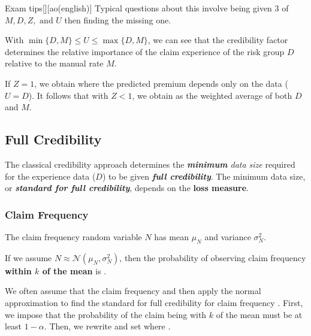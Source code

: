 \documentclass[english]{article}
\begin{document}
\begin{multicols*}{2}
\begin{definitionGENERAL}{Exam tips}[][ao(english)]
Typical questions about this involve being given 3 of $M, D, Z, \text{ and } U$ then finding the missing one.
\end{definitionGENERAL}


\begin{rappel_enhanced}[Context]
With $\min\{D, M\} \leq U \leq \max\{D, M\}$, we can see that the credibility factor determines the relative importance of the claim experience of the risk group $D$ relative to the manual rate $M$.

\bigskip

If $Z = 1$, we obtain \textit{\underline{}} where the predicted premium depends only on the data ($U = D$). It follows that with $Z < 1$, we obtain \textit{\underline{}} as the weighted average of both $D$ and $M$.
\end{rappel_enhanced}


\subsection{Full Credibility}\label{subsec:FullCred}
\begin{rappel_enhanced}[Contexte]
The classical credibility approach determines the \textit{\textbf{minimum} data size} required for the experience data ($D$) to be given \textbf{\textit{full credibility}}. The minimum data size, or \textit{\textbf{standard for full credibility}}, depends on the \textbf{loss measure}.
\end{rappel_enhanced}


\subsubsection{Claim Frequency}
The claim frequency random variable $N$ has mean $\mu_{N}$ and variance $\sigma^{2}_{N}$. 

If we assume $N \approx \mathcal{N}(\mu_{N}, \sigma^{2}_{N})$, then the probability of observing claim frequency \textbf{within $k$ of the mean} is .

\bigskip

We often assume that the claim frequency  and then apply the normal approximation to find the standard for full credibility for claim frequency . First, we impose that the probability of the claim being with $k$ of the mean must be at least $1 - \alpha$. Then, we rewrite  and set  where .



\end{multicols*}
\end{document}
